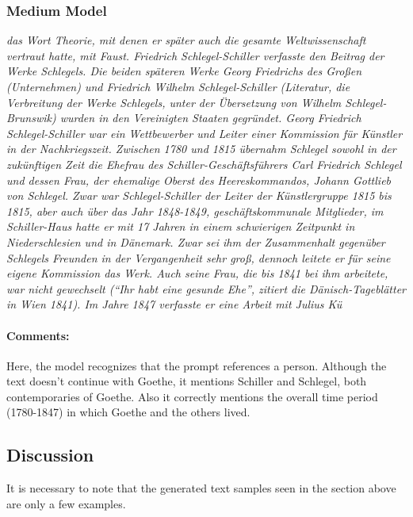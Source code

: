 \documentclass{scrartcl}
\begin{document}
\subsubsection{Medium Model}
{\itshape
 das Wort Theorie, mit denen er später auch die gesamte Weltwissenschaft vertraut hatte, mit Faust.
Friedrich Schlegel-Schiller verfasste den Beitrag der Werke Schlegels.
Die beiden späteren Werke Georg Friedrichs des Großen (Unternehmen) und Friedrich Wilhelm Schlegel-Schiller (Literatur, die Verbreitung der Werke Schlegels, unter der Übersetzung von Wilhelm Schlegel-Brunswik) wurden in den Vereinigten Staaten gegründet.
Georg Friedrich Schlegel-Schiller war ein Wettbewerber und Leiter einer Kommission für Künstler in der Nachkriegszeit.
Zwischen 1780 und 1815 übernahm Schlegel sowohl in der zukünftigen Zeit die Ehefrau des Schiller-Geschäftsführers Carl Friedrich Schlegel und dessen Frau, der ehemalige Oberst des Heereskommandos, Johann Gottlieb von Schlegel.
Zwar war Schlegel-Schiller der Leiter der Künstlergruppe 1815 bis 1815, aber auch über das Jahr 1848-1849, geschäftskommunale Mitglieder, im Schiller-Haus hatte er mit 17 Jahren in einem schwierigen Zeitpunkt in Niederschlesien und in Dänemark.
Zwar sei ihm der Zusammenhalt gegenüber Schlegels Freunden in der Vergangenheit sehr groß, dennoch leitete er für seine eigene Kommission das Werk.
Auch seine Frau, die bis 1841 bei ihm arbeitete, war nicht gewechselt (\enquote{Ihr habt eine gesunde Ehe}, zitiert die Dänisch-Tageblätter in Wien 1841).
Im Jahre 1847 verfasste er eine Arbeit mit Julius Kü
}

\paragraph{Comments:} Here, the model recognizes that the prompt references a person. Although the text doesn't continue with Goethe, it mentions Schiller and Schlegel, both contemporaries of Goethe. Also it correctly mentions the overall time period (1780-1847) in which Goethe and the others lived.

\subsection{Discussion}
It is necessary to note that the generated text samples seen in the section above are only a few examples.
\end{document}
